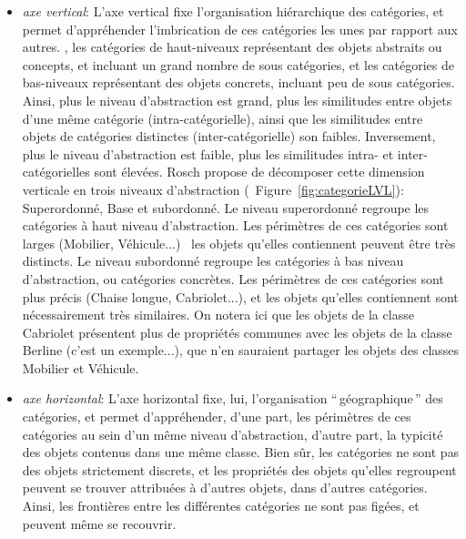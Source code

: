 \begin{itemize}
\item \textit{axe vertical}: L'axe vertical fixe l'organisation hiérarchique des catégories, et permet d'appréhender l'imbrication de ces catégories les unes par rapport aux autres. , les catégories de haut-niveaux représentant des objets abstraits ou concepts, et incluant un grand nombre de sous catégories, et les catégories de bas-niveaux représentant des objets concrets, incluant peu de sous catégories. Ainsi, plus le niveau d'abstraction est grand, plus les similitudes entre objets d'une même catégorie (intra-catégorielle), ainsi que les similitudes entre objets de catégories distinctes (inter-catégorielle) son faibles. Inversement, plus le niveau d'abstraction est faible, plus les similitudes intra- et inter-catégorielles sont élevées. Rosch propose de décomposer cette dimension verticale en trois niveaux d'abstraction (\Cf~Figure~\ref{fig:categorieLVL}): Superordonné, Base et subordonné. Le niveau superordonné regroupe les catégories à haut niveau d'abstraction. Les périmètres de ces catégories sont larges (Mobilier, Véhicule...) \ie~les objets qu'elles contiennent peuvent être très distincts. Le niveau subordonné regroupe les catégories à bas niveau d'abstraction, ou catégories concrètes. Les périmètres de ces catégories sont plus précis (Chaise longue, Cabriolet...), et les objets qu'elles contiennent sont nécessairement très similaires. On notera ici que les objets de la classe Cabriolet présentent plus de propriétés communes avec les objets de la classe Berline (c'est un exemple...), que n'en sauraient partager les objets des classes Mobilier et Véhicule.
\item \textit{axe horizontal}: L'axe horizontal fixe, lui, l'organisation ``\,géographique\,'' des catégories, et permet d'appréhender, d'une part, les périmètres de ces catégories au sein d'un même niveau d'abstraction, d'autre part, la typicité des objets contenus dans une même classe. Bien sûr, les catégories ne sont pas des objets strictement discrets, et les propriétés des objets qu'elles regroupent peuvent se trouver attribuées à d'autres objets, dans d'autres catégories. Ainsi, les frontières entre les différentes catégories ne sont pas figées, et peuvent même se recouvrir.
\end{itemize}

